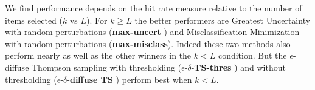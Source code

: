 \documentclass[nonblindrev]{informs3}
\newcommand{\mismin}{\textbf{max-misclass}}
\newcommand{\edts}{$\epsilon$-$\delta$-\textbf{diffuse TS} }
\newcommand{\edtsthres}{$\epsilon$-$\delta$-\textbf{TS-thres} }
\newcommand{\uncert}{\textbf{max-uncert} }
\begin{document}



We find performance depends on the hit rate measure relative to the number of items selected ($k$ vs $L$).
For $k \ge L$ the better performers are Greatest Uncertainty with random perturbations (\uncert) and Misclassification Minimization with random perturbations (\mismin). Indeed these two methods also perform nearly as well as the other winners in the $k < L$ condition. But the $\epsilon$-diffuse Thompson sampling with thresholding (\edtsthres) and without thresholding (\edts) perform best when $k<L$. 
\end{document}
